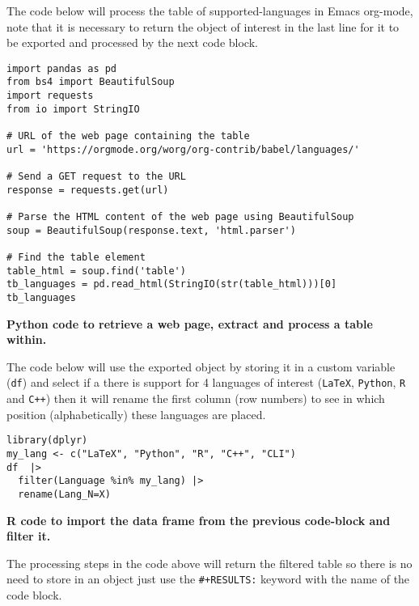 \documentclass[12pt]{article}
\newenvironment{code}{\captionsetup{labelfont=bf, type=listing, name=Snippet, aboveskip=-3pt ,belowskip=15pt}}{}
\begin{document}
The code below will process the table of supported-languages in Emacs org-mode, note that it is necessary to return the object of interest in the last line for it to be exported and processed by the next code block.\\

\begin{code}
\begin{verbatim}
import pandas as pd
from bs4 import BeautifulSoup
import requests
from io import StringIO

# URL of the web page containing the table
url = 'https://orgmode.org/worg/org-contrib/babel/languages/'

# Send a GET request to the URL
response = requests.get(url)

# Parse the HTML content of the web page using BeautifulSoup
soup = BeautifulSoup(response.text, 'html.parser')

# Find the table element
table_html = soup.find('table')
tb_languages = pd.read_html(StringIO(str(table_html)))[0]
tb_languages
\end{verbatim}
\caption{\label{lst:org5b0cf49}\textbf{Python code to retrieve a web page, extract and process a table within.}}
\end{code}

The code below will use the exported object by storing it in a custom variable (\texttt{df}) and select if a there is support for 4 languages of interest (\texttt{LaTeX}, \texttt{Python}, \texttt{R} and \texttt{C++}) then it will rename the first column (row numbers) to see in which position (alphabetically) these languages are placed.\\

\begin{code}
\begin{verbatim}
library(dplyr)
my_lang <- c("LaTeX", "Python", "R", "C++", "CLI")
df  |>
  filter(Language %in% my_lang) |>
  rename(Lang_N=X)
\end{verbatim}
\caption{\label{lst:org97e5418}\textbf{R code to import the data frame from the previous code-block and filter it.}}
\end{code}

The processing steps in the code above will return the filtered table so there is no need to store in an object just use the \texttt{\#+RESULTS:} keyword with the name of the code block.
\end{document}
